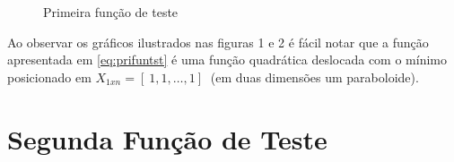 \begin{figure}[h!]
    \centering 
    \qquad
    \qquad
    \caption{Primeira função de teste}%
    \label{fig:prifun}%
\end{figure}
 \FloatBarrier
Ao observar os gráficos ilustrados nas figuras 1 e 2 é fácil notar que a função apresentada em \ref{eq:prifuntst} é uma função quadrática deslocada com o mínimo posicionado em $X_{1xn}=[\ 1 , 1 , \ldots , 1 ]\ $ (em duas dimensões um paraboloide).

\section{Segunda Função de Teste}\label{sec:secfun}

